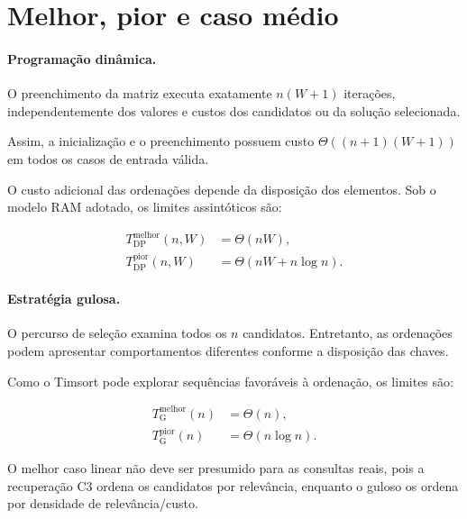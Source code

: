 \documentclass[11pt,a4paper]{article}
\theoremstyle{plain}
\theoremstyle{definition}
\theoremstyle{plain}
\begin{document}
\section{Melhor, pior e caso médio}

\paragraph{Programação dinâmica.}

O preenchimento da matriz executa
exatamente $n(W+1)$ iterações,
independentemente dos valores e custos
dos candidatos ou da solução selecionada.

Assim, a inicialização e o preenchimento
possuem custo
$\Theta((n+1)(W+1))$ em todos
os casos de entrada válida.

O custo adicional das ordenações
depende da disposição dos elementos.
Sob o modelo RAM adotado, os limites
assintóticos são:

\begin{equation}
\begin{aligned}
T_{\mathrm{DP}}^{\mathrm{melhor}}(n,W)
&=\Theta(nW),\\
T_{\mathrm{DP}}^{\mathrm{pior}}(n,W)
&=\Theta(nW+n\log n).
\end{aligned}
\label{eq:casos_dp_av2}
\end{equation}

\paragraph{Estratégia gulosa.}

O percurso de seleção examina
todos os $n$ candidatos. Entretanto,
as ordenações podem apresentar
comportamentos diferentes conforme
a disposição das chaves.

Como o Timsort pode explorar
sequências favoráveis à ordenação,
os limites são:

\begin{equation}
\begin{aligned}
T_{\mathrm{G}}^{\mathrm{melhor}}(n)
&=\Theta(n),\\
T_{\mathrm{G}}^{\mathrm{pior}}(n)
&=\Theta(n\log n).
\end{aligned}
\label{eq:casos_guloso_av2}
\end{equation}

O melhor caso linear não deve ser
presumido para as consultas reais,
pois a recuperação C3 ordena os
candidatos por relevância, enquanto
o guloso os ordena por densidade
de relevância/custo.
\end{document}
